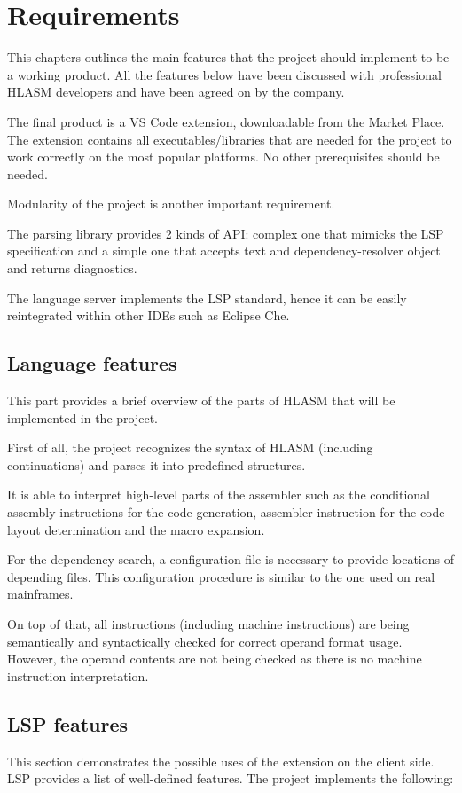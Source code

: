 \chapter{Requirements}

This chapters outlines the main features that the project should implement to be a working product. All the features below have been discussed with professional HLASM developers and have been agreed on by the company.

The final product is a VS Code extension, downloadable from the Market Place. The extension contains all executables/libraries that are needed for the project to work correctly on the most popular platforms. No other prerequisites should be needed.

Modularity of the project is another important requirement. 

The parsing library provides 2 kinds of API: complex one that mimicks the LSP specification and a simple one that accepts text and dependency-resolver object and returns diagnostics. 

The language server implements the LSP standard, hence it can be easily reintegrated within other IDEs such as Eclipse Che.

\section{Language features}
This part provides a brief overview of the parts of HLASM that will be implemented in  the project.

First of all, the project recognizes the syntax of HLASM (including continuations) and parses it into predefined structures. 

It is able to interpret high-level parts of the assembler such as the conditional assembly instructions for the code generation, assembler instruction for the code layout determination and the macro expansion.

For the dependency search, a configuration file is necessary to provide locations of depending files. This configuration procedure is similar to the one used on real mainframes.

On top of that, all instructions (including machine instructions) are being semantically and syntactically checked for correct operand format usage. However, the operand contents are not being checked as there is no machine instruction interpretation.



\section{LSP features}
This section demonstrates the possible uses of the extension on the client side. LSP provides a list of well-defined features. The project implements the following:

